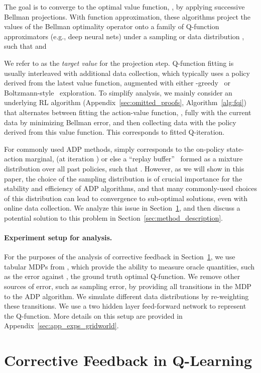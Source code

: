 \documentclass[jmlr]{article}
\begin{document}
The goal is to converge to the optimal value function, , by applying successive Bellman projections.
With function approximation, these algorithms project the values of the Bellman optimality operator  onto a family of Q-function approximators  (e.g., deep neural nets) under a sampling or data distribution , such that  and

We refer to  as the \textit{target value} for the projection step. 
Q-function fitting is usually interleaved with additional data collection, which typically uses a policy derived from the latest value function, augmented with either -greedy~\citep{Mnih2015} or Boltzmann-style~\citep{Haarnoja18} exploration.
To simplify analysis, we mainly consider an underlying RL algorithm (Appendix~\ref{sec:omitted_proofs}, Algorithm~\ref{alg:fqi}) that alternates between fitting the action-value function, , fully with the current data by minimizing Bellman error, and then collecting data with the policy derived from this value function. This corresponds to fitted Q-iteration.

For commonly used ADP methods,  simply corresponds to the on-policy state-action marginal,  (at iteration ) or else a ``replay buffer''~\citep{Haarnoja18,Mnih2015,Lillicrap2015} formed as a mixture distribution over all past policies, such that .
However, as we will show in this paper, the choice of the sampling distribution  is of crucial importance for the stability and efficiency of ADP algorithms, and that many commonly-used choices of this distribution can lead to convergence to sub-optimal solutions, even with online data collection. We analyze this issue in Section~\ref{sec:problem_description},
and then discuss a potential solution to this problem in Section~\ref{sec:method_description}.

\paragraph{Experiment setup for analysis.} For the purposes of the analysis of corrective feedback in Section~\ref{sec:problem_description}, we use tabular MDPs from \cite{fu19diagnosing}, which provide the ability to measure oracle quantities, such as the error against , the ground truth optimal Q-function. We remove other sources of error, such as sampling error, by providing all transitions in the MDP to the ADP algorithm. 
We simulate different data distributions by re-weighting these transitions. We use a two hidden layer feed-forward network to represent the Q-function. More details on this setup are provided in Appendix~\ref{sec:app_exps_gridworld}. \section{Corrective Feedback in Q-Learning}
\label{sec:problem_description}
\end{document}
